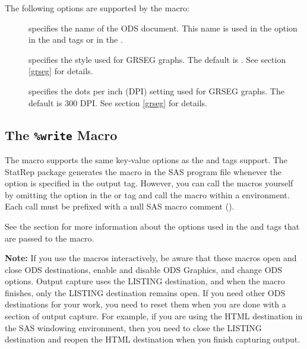 \documentclass[article,oneside]{memoir}
\newcommand*{\StatRep}{\textsf{StatRep}\xspace}
\begin{document}
  The following options are supported by the  macro:
 \begin{description}
 \item[] specifies the name of the ODS document. 
  This name is used in the  option in the  and  tags
  or in the . 
  
 \item[] specifies the style used for GRSEG graphs. 
 The default is . See section \ref{grseg} for details.
 
 \item[] specifies the dots per inch (DPI) setting used for GRSEG graphs.
  The default is 300 DPI. See section \ref{grseg} for details.
 \end{description}
 
  
  \subsection{The \texttt{\%write} Macro}
  The  macro supports the same key-value options as the  and 
   tags support. 
  The \StatRep package generates the  macro in the SAS program
  file whenever the  option is specified in the output tag. 
  However, you can call the macros
  yourself by omitting the  option in the  or 
  tag and call the macro within a  environment. Each call must be prefixed 
  with a null SAS macro comment (\Code{\%*;}). 
  
See the section  for more information about the options used in the 
 and  tags that are passed to the  macro.
  

\vspace*{1em}\noindent\textbf{Note:} If you use the macros interactively, be aware that
these macros open and close ODS destinations,
enable and disable ODS Graphics, and change ODS options.  Output capture uses the 
LISTING destination, and when the  macro finishes, only the 
LISTING destination remains open.   
If you need other ODS destinations for your work, you need to reset them 
when you are done with a section of output capture.  For example, 
if you are using the HTML destination  
in the SAS windowing environment, then you need to 
close the LISTING destination and reopen the HTML destination when you finish
capturing output.
\end{document}

